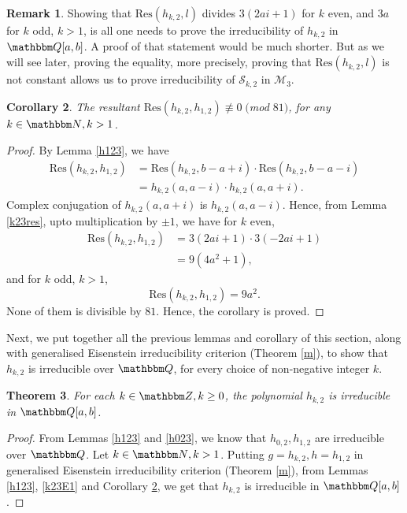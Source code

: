 \documentclass[reqno]{amsart}
\numberwithin{equation}{section}
\theoremstyle{plain}
\newtheorem{theorem}{Theorem}[section]
\newtheorem{corollary}[theorem]{Corollary}
\theoremstyle{definition}
\newtheorem{remark}[theorem]{Remark}
\theoremstyle{definition}
\newcommand{\Q}{{\mathbbm Q}}
\newcommand{\Z}{{\mathbbm Z}}
\newcommand{\N}{{\mathbbm N}}
\begin{document}
    \begin{remark}
        Showing that $\mbox{Res}(h_{k,2},l)$ divides $3(2ai+1)$ for $k$ even, and $3a$ for $k$ odd, $k>1$, is all one needs to prove the irreducibility of $h_{k,2}$ in $\Q[a,b]$. A proof of that statement would be much shorter. But as we will see later, proving the equality, more precisely,  proving that $\mbox{Res}(h_{k,2},l)$ is not constant allows us to prove irreducibility of $\mathscr{S}_{k,2}$ in $\mathcal{M}_{3}$.
    \end{remark}
    \begin{corollary}\label{k23res2}
        The resultant $\mbox{Res}(h_{k,2},h_{1,2})\not\equiv 0\;($mod $81)$, for any $k\in \N, k>1$.
    \end{corollary}
    \begin{proof}
        By Lemma \ref{h123}, we have
        \begin{align*}
            \mbox{Res}(h_{k,2},h_{1,2}) & =\mbox{Res}(h_{k,2},b-a+i)\cdot \mbox{Res}(h_{k,2},b-a-i)\\
            & =h_{k,2}(a,a-i)\cdot h_{k,2}(a,a+i).
        \end{align*}
        Complex conjugation of $h_{k,2}(a,a+i)$ is $h_{k,2}(a,a-i)$. Hence, from Lemma \ref{k23res}, upto multiplication by $\pm 1$, we have for $k$ even, 
        \begin{align*}
            \mbox{Res}(h_{k,2},h_{1,2}) & = 3(2ai+1)\cdot 3(-2ai+1)\\
            & = 9(4a^{2}+1),
        \end{align*}
        and for $k$ odd, $k>1$, 
        $$\mbox{Res}(h_{k,2},h_{1,2})=9a^{2}.$$ None of them is divisible by $81$. Hence, the corollary is proved.
    \end{proof}
    Next, we put together all the previous lemmas and corollary of this section, along with generalised Eisenstein irreducibility criterion (Theorem \ref{m}), to show that $h_{k,2}$ is irreducible over $\Q$, for every choice of non-negative integer $k$.
    \begin{theorem}\label{irrqk23}
        For each $k\in \Z, k \geq 0$, the polynomial $h_{k,2}$ is irreducible in $\Q[a,b]$. 
    \end{theorem}
    \begin{proof}
        From Lemmas \ref{h123} and \ref{h023}, we know that $h_{0,2},h_{1,2}$ are irreducible over $\Q$. Let $k\in \N, k>1$. Putting $g=h_{k,2}, h=h_{1,2}$ in generalised Eisenstein irreducibility criterion (Theorem \ref{m}), from Lemmas \ref{h123}, \ref{k23E1} and Corollary \ref{k23res2}, we get that $h_{k,2}$ is irreducible in $\Q[a,b]$.  
    \end{proof}
\end{document}
